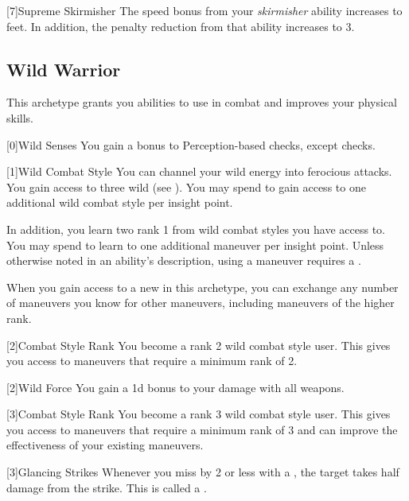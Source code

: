         [7]{Supreme Skirmisher} The speed bonus from your \textit{skirmisher} ability increases to  feet.
        In addition, the penalty reduction from that ability increases to 3.

    \newpage
    \subsection{Wild Warrior}
        This archetype grants you abilities to use in combat and improves your physical skills.

        [0]{Wild Senses} You gain a  bonus to Perception-based checks, except  checks.

        {
            [1]{Wild Combat Style}
            You can channel your wild energy into ferocious attacks.
            You gain access to three wild  (see ).
            You may spend  to gain access to one additional wild combat style per insight point.

            In addition, you learn two rank 1  from wild combat styles you have access to.
            You may spend  to learn to one additional maneuver per insight point.
            Unless otherwise noted in an ability's description, using a maneuver requires a .

            When you gain access to a new  in this archetype,
                you can exchange any number of maneuvers you know for other maneuvers,
                including maneuvers of the higher rank.
        }

        {
            [2]{Combat Style Rank} You become a rank 2 wild combat style user.
            This gives you access to maneuvers that require a minimum rank of 2.

            [2]{Wild Force} You gain a \plus1d bonus to your damage with all weapons.
        }

        {
            [3]{Combat Style Rank} You become a rank 3 wild combat style user.
            This gives you access to maneuvers that require a minimum rank of 3 and can improve the effectiveness of your existing maneuvers.

            [3]{Glancing Strikes} Whenever you miss by 2 or less with a , the target takes half damage from the strike.
            This is called a .
        }


